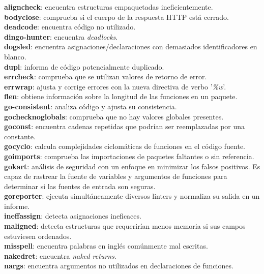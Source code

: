 \textbf{aligncheck}: encuentra estructuras empaquetadas ineficientemente.\\
\textbf{bodyclose}: comprueba si el cuerpo de la respuesta HTTP está cerrado.\\
\textbf{deadcode}: encuentra código no utilizado.\\
\textbf{dingo-hunter}: encuentra \textit{deadlocks}.\\
\textbf{dogsled}: encuentra asignaciones/declaraciones con demasiados identificadores en blanco.\\
\textbf{dupl}: informa de código potencialmente duplicado.\\
\textbf{errcheck}: comprueba que se utilizan valores de retorno de error.\\
\textbf{errwrap}: ajusta y corrige errores con la nueva directiva de verbo '\textit{\%w}'.\\
\textbf{flen}: obtiene información sobre la longitud de las funciones en un paquete.\\
\textbf{go-consistent}: analiza código y ajusta su consistencia.\\
\textbf{gochecknoglobals}: comprueba que no hay valores globales presentes.\\
\textbf{goconst}: encuentra cadenas repetidas que podrían ser reemplazadas por una constante.\\
\textbf{gocyclo}: calcula complejidades ciclomáticas de funciones en el código fuente.\\
\textbf{goimports}: comprueba las importaciones de paquetes faltantes o sin referencia.\\
\textbf{gokart}: análisis de seguridad con un enfoque en minimizar los falsos positivos. Es capaz de rastrear la fuente de variables y argumentos de funciones para determinar si las fuentes de entrada son seguras.\\
\textbf{goreporter}: ejecuta simultáneamente diversos linters y normaliza su salida en un informe.\\
\textbf{ineffassign}: detecta asignaciones ineficaces.\\
\textbf{maligned}: detecta estructuras que requerirían menos memoria si sus campos estuviesen ordenados.\\
\textbf{misspell}: encuentra palabras en inglés comúnmente mal escritas.\\
\textbf{nakedret}: encuentra \textit{naked returns}.\\
\textbf{nargs}: encuentra argumentos no utilizados en declaraciones de funciones.\\
